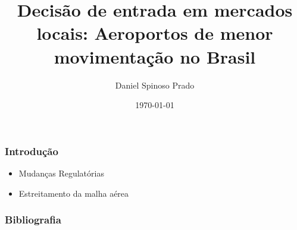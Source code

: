 \documentclass{beamer}
\author{Daniel Spinoso Prado}
\title{Decisão de entrada em mercados locais: Aeroportos de menor movimentação no Brasil}
\date{\today}
\begin{document}
\maketitle


\begin{frame}[fragile]
\frametitle{Introdução}

\begin{itemize}
	\item Mudanças Regulatórias
	\item Estreitamento da malha aérea
\end{itemize}

\end{frame}


\begin{frame}[t,allowframebreaks]
\frametitle{Bibliografia}

%
\end{frame}
\end{document}
